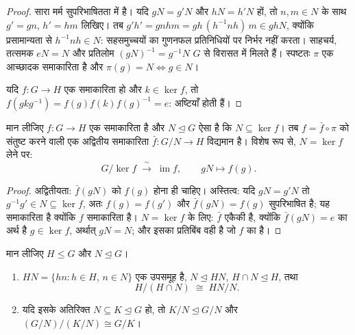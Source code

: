 \begin{proof}
सारा मर्म सुपरिभाषितता में है। यदि $gN = g'N$ और $hN = h'N$ हों, तो
$n, m \in N$ के साथ $g' = gn$, $h' = hm$ लिखिए। तब $g'h' = gnhm =
gh\,(h^{-1}nh)\,m \in ghN$, क्योंकि प्रसामान्यता से
$h^{-1}nh \in N$: सहसमुच्चयों का गुणनफल प्रतिनिधियों पर निर्भर नहीं करता।
साहचर्य, तत्समक $eN = N$ और प्रतिलोम $(gN)^{-1} = g^{-1}N$ $G$ से विरासत में मिलते
हैं। स्पष्टतः $\pi$ एक आच्छादक समाकारिता है और $\pi(g) = N \iff g \in N$।

यदि $f \colon G \to H$ एक समाकारिता हो और $k \in \ker f$, तो $f(gkg^{-1}) = f(g)f(k)f(g)^{-1} = e$: अष्टियाँ 
होती हैं।
\end{proof}

\begin{theorem}[सार्वत्रिक गुण; प्रथम तुल्याकारिता प्रमेय]
\label{thm:b3:groups:firstiso}
मान लीजिए $f \colon G \to H$ एक समाकारिता है और $N \trianglelefteq G$ ऐसा है कि $N \subseteq \ker f$। तब
$f = \bar f \circ \pi$ को संतुष्ट करने वाली एक अद्वितीय समाकारिता $\bar f \colon G/N
\to H$ विद्यमान
है। विशेष रूप से, $N = \ker
f$ लेने पर:
\[
G/\ker f \;\xrightarrow{\;\sim\;}\; \operatorname{im} f,
\qquad gN \mapsto f(g).
\]
\end{theorem}

\begin{proof}
अद्वितीयता: $\bar f(gN)$ को $f(g)$ होना ही चाहिए। अस्तित्व: यदि $gN = g'N$ तो
$g^{-1}g' \in N \subseteq \ker f$, अतः $f(g) = f(g')$ और $\bar
f(gN) = f(g)$ सुपरिभाषित है; यह समाकारिता है क्योंकि
$f$ समाकारिता है। $N = \ker f$ के लिए: $\bar f$ एकैकी है, क्योंकि $\bar f(gN) = e$ का
अर्थ है $g \in \ker f$, अर्थात् $gN = N$; और इसका प्रतिबिंब वही है जो $f$ का
है।
\end{proof}

\begin{theorem}[द्वितीय और तृतीय तुल्याकारिता प्रमेय]
\label{thm:b3:groups:secondiso}
मान लीजिए $H \leq G$ और $N \trianglelefteq G$।
\begin{enumerate}
  \item $HN = \{hn : h \in H,\, n \in N\}$ एक उपसमूह है, $N
        \trianglelefteq HN$, $H \cap N \trianglelefteq H$, तथा
        \[
        H/(H \cap N) \;\cong\; HN/N .
        \]
  \item यदि इसके अतिरिक्त $N \subseteq K \trianglelefteq G$ हो, तो $K/N
        \trianglelefteq G/N$ और $(G/N)\big/(K/N) \cong G/K$।
\end{enumerate}
\end{theorem}

